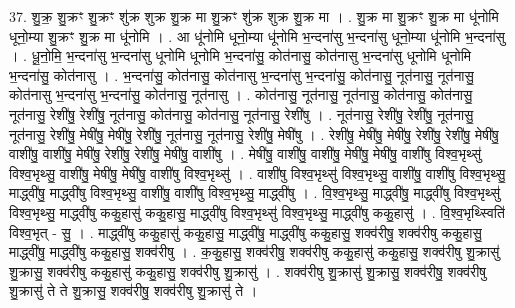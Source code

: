 \documentclass[17pt]{extarticle}
\begin{document}
37. शु॒क्र॒ शु॒क्रꣳ शु॒क्रꣳ शु॑क्र शुक्र शु॒क्र मा शु॒क्रꣳ शु॑क्र शुक्र शु॒क्र मा । . शु॒क्र मा शु॒क्रꣳ शु॒क्र मा धू॑नोमि धूनो॒म्या शु॒क्रꣳ शु॒क्र मा धू॑नोमि । . आ धू॑नोमि धूनो॒म्या धू॑नोमि भ॒न्दना॑सु भ॒न्दना॑सु धूनो॒म्या धू॑नोमि भ॒न्दना॑सु । . धू॒नो॒मि॒ भ॒न्दना॑सु भ॒न्दना॑सु धूनोमि धूनोमि भ॒न्दना॑सु॒ कोत॑नासु॒ कोत॑नासु भ॒न्दना॑सु धूनोमि धूनोमि भ॒न्दना॑सु॒ कोत॑नासु । . भ॒न्दना॑सु॒ कोत॑नासु॒ कोत॑नासु भ॒न्दना॑सु भ॒न्दना॑सु॒ कोत॑नासु॒ नूत॑नासु॒ नूत॑नासु॒ कोत॑नासु भ॒न्दना॑सु भ॒न्दना॑सु॒ कोत॑नासु॒ नूत॑नासु । . कोत॑नासु॒ नूत॑नासु॒ नूत॑नासु॒ कोत॑नासु॒ कोत॑नासु॒ नूत॑नासु॒ रेशी॑षु॒ रेशी॑षु॒ नूत॑नासु॒ कोत॑नासु॒ कोत॑नासु॒ नूत॑नासु॒ रेशी॑षु । . नूत॑नासु॒ रेशी॑षु॒ रेशी॑षु॒ नूत॑नासु॒ नूत॑नासु॒ रेशी॑षु॒ मेषी॑षु॒ मेषी॑षु॒ रेशी॑षु॒ नूत॑नासु॒ नूत॑नासु॒ रेशी॑षु॒ मेषी॑षु । . रेशी॑षु॒ मेषी॑षु॒ मेषी॑षु॒ रेशी॑षु॒ रेशी॑षु॒ मेषी॑षु॒ वाशी॑षु॒ वाशी॑षु॒ मेषी॑षु॒ रेशी॑षु॒ रेशी॑षु॒ मेषी॑षु॒ वाशी॑षु । . मेषी॑षु॒ वाशी॑षु॒ वाशी॑षु॒ मेषी॑षु॒ मेषी॑षु॒ वाशी॑षु विश्व॒भृथ्सु॑ विश्व॒भृथ्सु॒ वाशी॑षु॒ मेषी॑षु॒ मेषी॑षु॒ वाशी॑षु विश्व॒भृथ्सु॑ । . वाशी॑षु विश्व॒भृथ्सु॑ विश्व॒भृथ्सु॒ वाशी॑षु॒ वाशी॑षु विश्व॒भृथ्सु॒ माद्ध्वी॑षु॒ माद्ध्वी॑षु विश्व॒भृथ्सु॒ वाशी॑षु॒ वाशी॑षु विश्व॒भृथ्सु॒ माद्ध्वी॑षु । . वि॒श्व॒भृथ्सु॒ माद्ध्वी॑षु॒ माद्ध्वी॑षु विश्व॒भृथ्सु॑ विश्व॒भृथ्सु॒ माद्ध्वी॑षु ककु॒हासु॑ ककु॒हासु॒ माद्ध्वी॑षु विश्व॒भृथ्सु॑ विश्व॒भृथ्सु॒ माद्ध्वी॑षु ककु॒हासु॑ । . वि॒श्व॒भृथ्स्विति॑ विश्व॒भृत् - सु॒ । . माद्ध्वी॑षु ककु॒हासु॑ ककु॒हासु॒ माद्ध्वी॑षु॒ माद्ध्वी॑षु ककु॒हासु॒ शक्व॑रीषु॒ शक्व॑रीषु ककु॒हासु॒ माद्ध्वी॑षु॒ माद्ध्वी॑षु ककु॒हासु॒ शक्व॑रीषु । . क॒कु॒हासु॒ शक्व॑रीषु॒ शक्व॑रीषु ककु॒हासु॑ ककु॒हासु॒ शक्व॑रीषु शु॒क्रासु॑ शु॒क्रासु॒ शक्व॑रीषु ककु॒हासु॑ ककु॒हासु॒ शक्व॑रीषु शु॒क्रासु॑ । . शक्व॑रीषु शु॒क्रासु॑ शु॒क्रासु॒ शक्व॑रीषु॒ शक्व॑रीषु शु॒क्रासु॑ ते ते शु॒क्रासु॒ शक्व॑रीषु॒ शक्व॑रीषु शु॒क्रासु॑ ते । \newline
\pagebreak
{}
\end{document}

